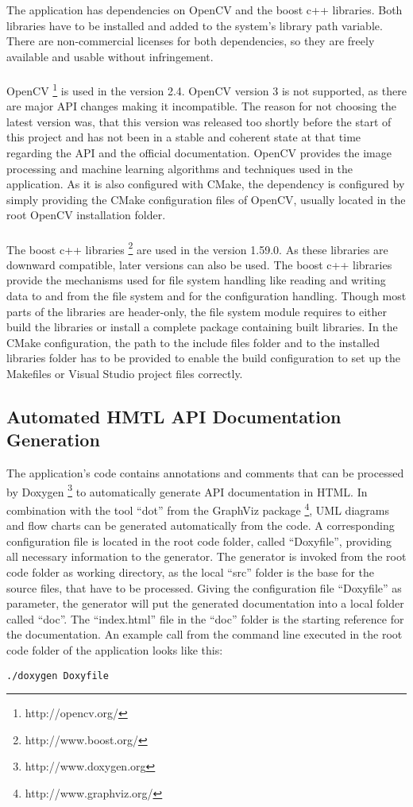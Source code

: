 The application has dependencies on OpenCV and the boost c++ libraries. Both libraries have to be installed and added to the system's library path variable. There are non-commercial licenses for both dependencies, so they are freely available and usable without infringement.
\\
\\
OpenCV \footnote{http://opencv.org/} is used in the version 2.4. OpenCV version 3 is not supported, as there are major API changes making it incompatible. The reason for not choosing the latest version was, that this version was released too shortly before the start of this project and has not been in a stable and coherent state at that time regarding the API and the official documentation. OpenCV provides the image processing and machine learning algorithms and techniques used in the application. As it is also configured with CMake, the dependency is configured by simply providing the CMake configuration files of OpenCV, usually located in the root OpenCV installation folder.
\\
\\
The boost c++ libraries \footnote{http://www.boost.org/} are used in the version 1.59.0. As these libraries are downward compatible, later versions can also be used. The boost c++ libraries provide the mechanisms used for file system handling like reading and writing data to and from the file system and for the configuration handling. Though most parts of the libraries are header-only, the file system module requires to either build the libraries or install a complete package containing built libraries. In the CMake configuration, the path to the include files folder and to the installed libraries folder has to be provided to enable the build configuration to set up the Makefiles or Visual Studio project files correctly.


\subsection{Automated HMTL API Documentation Generation}

The application's code contains annotations and comments that can be processed by Doxygen \footnote{http://www.doxygen.org} to automatically generate API documentation in HTML. In combination with the tool "`dot"' from the GraphViz package \footnote{http://www.graphviz.org/}, UML diagrams and flow charts can be generated automatically from the code. A corresponding configuration file is located in the root code folder, called "`Doxyfile"', providing all necessary information to the generator. The generator is invoked from the root code folder as working directory, as the local "`src"' folder is the base for the source files, that have to be processed. Giving the configuration file "`Doxyfile"' as parameter, the generator will put the generated documentation into a local folder called "`doc"'. The "`index.html"' file in the "`doc"' folder is the starting reference for the documentation. An example call from the command line executed in the root code folder of the application looks like this:
\begin{verbatim}
./doxygen Doxyfile
\end{verbatim}


